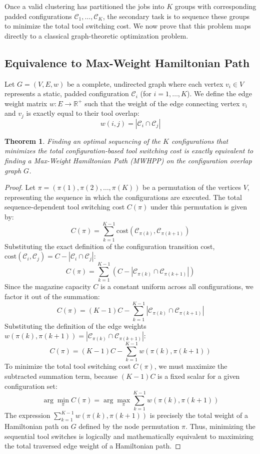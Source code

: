 \documentclass[11pt,a4paper]{article}
\theoremstyle{plain}
\newtheorem{theorem}{Theorem}[section]
\theoremstyle{definition}
\newcommand{\JGP}{\text{JGP}}
\begin{document}
Once a valid \JGP{} clustering has partitioned the jobs into $K$ groups with corresponding padded configurations $\mathcal{C}_1, \dots, \mathcal{C}_K$, the secondary task is to sequence these groups to minimize the total tool switching cost. We now prove that this problem maps directly to a classical graph-theoretic optimization problem.

\subsection{Equivalence to Max-Weight Hamiltonian Path}
Let $G = (V, E, w)$ be a complete, undirected graph where each vertex $v_i \in V$ represents a static, padded configuration $\mathcal{C}_i$ (for $i = 1, \dots, K$). We define the edge weight matrix $w: E \to \mathbb{R}^+$ such that the weight of the edge connecting vertex $v_i$ and $v_j$ is exactly equal to their tool overlap:
\begin{equation}
	w(i, j) = |\mathcal{C}_i \cap \mathcal{C}_j|
\end{equation}

\begin{theorem}\label{thm:mwhp}
	Finding an optimal sequencing of the $K$ configurations that minimizes the total configuration-based tool switching cost is exactly equivalent to finding a Max-Weight Hamiltonian Path (MWHPP) on the configuration overlap graph $G$.
\end{theorem}

\begin{proof}
	Let $\pi = (\pi(1), \pi(2), \dots, \pi(K))$ be a permutation of the vertices $V$, representing the sequence in which the configurations are executed. The total sequence-dependent tool switching cost $C(\pi)$ under this permutation is given by:
	\[ C(\pi) = \sum_{k=1}^{K-1} \text{cost}(\mathcal{C}_{\pi(k)}, \mathcal{C}_{\pi(k+1)}) \]
	Substituting the exact definition of the configuration transition cost, $\text{cost}(\mathcal{C}_i, \mathcal{C}_j) = C - |\mathcal{C}_i \cap \mathcal{C}_j|$:
	\[ C(\pi) = \sum_{k=1}^{K-1} \left( C - |\mathcal{C}_{\pi(k)} \cap \mathcal{C}_{\pi(k+1)}| \right) \]
	Since the magazine capacity $C$ is a constant uniform across all configurations, we factor it out of the summation:
	\[ C(\pi) = (K-1)C - \sum_{k=1}^{K-1} |\mathcal{C}_{\pi(k)} \cap \mathcal{C}_{\pi(k+1)}| \]
	Substituting the definition of the edge weights $w(\pi(k), \pi(k+1)) = |\mathcal{C}_{\pi(k)} \cap \mathcal{C}_{\pi(k+1)}|$:
	\[ C(\pi) = (K-1)C - \sum_{k=1}^{K-1} w(\pi(k), \pi(k+1)) \]
	To minimize the total tool switching cost $C(\pi)$, we must maximize the subtracted summation term, because $(K-1)C$ is a fixed scalar for a given configuration set:
	\[ \arg\min_{\pi} C(\pi) = \arg\max_{\pi} \sum_{k=1}^{K-1} w(\pi(k), \pi(k+1)) \]
	The expression $\sum_{k=1}^{K-1} w(\pi(k), \pi(k+1))$ is precisely the total weight of a Hamiltonian path on $G$ defined by the node permutation $\pi$. Thus, minimizing the sequential tool switches is logically and mathematically equivalent to maximizing the total traversed edge weight of a Hamiltonian path.
\end{proof}
\end{document}
